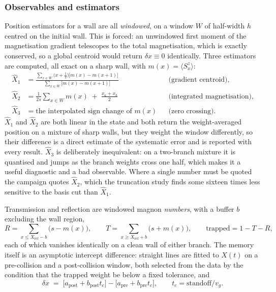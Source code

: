 \subsubsection{Observables and estimators}

Position estimators for a wall are all \emph{windowed}, on a window $W$ of
half-width $h$ centred on the initial wall. This is forced: an unwindowed
first moment of the magnetisation gradient telescopes to the total
magnetisation, which is exactly conserved, so a global centroid would return
$\delta x \equiv 0$ identically. Three estimators are computed, all exact on a
sharp wall, with $m(x) = \langle S^z_x\rangle$:
\begin{align}
  \hat X_1 &= \frac{\sum_{x\in W}\bigl(x+\tfrac12\bigr)\bigl[m(x)-m(x+1)\bigr]}
                   {\sum_{x\in W}\bigl[m(x)-m(x+1)\bigr]}
             && \text{(gradient centroid),}\label{eq:num-X1}\\
  \hat X_2 &= \frac{1}{2s}\sum_{x\in W} m(x) \;+\; \frac{x_a+x_b}{2}
             && \text{(integrated magnetisation),}\label{eq:num-X2}\\
  \hat X_3 &= \text{the interpolated sign change of } m(x)
             && \text{(zero crossing).}\label{eq:num-X3}
\end{align}
$\hat X_1$ and $\hat X_2$ are both linear in the state and both return the
weight-averaged position on a mixture of sharp walls, but they weight the
window differently, so their difference is a direct estimate of the systematic
error and is reported with every result. $\hat X_3$ is deliberately
inequivalent: on a two-branch mixture it is quantised and jumps as the branch
weights cross one half, which makes it a useful diagnostic and a bad
observable. Where a single number must be quoted the campaign quotes
$\hat X_2$, which the truncation study finds some sixteen times less sensitive
to the basis cut than $\hat X_1$.

Transmission and reflection are windowed magnon \emph{numbers}, with a buffer
$b$ excluding the wall region,
\begin{equation}
  R = \sum_{x \leq X_{\mathrm{ref}}-b}\bigl(s - m(x)\bigr), \qquad
  T = \sum_{x \geq X_{\mathrm{ref}}+b}\bigl(s + m(x)\bigr), \qquad
  \text{trapped} = 1 - T - R,
  \label{eq:num-TR}
\end{equation}
each of which vanishes identically on a clean wall of either branch. The
memory itself is an asymptotic intercept difference: straight lines are fitted
to $X(t)$ on a pre-collision and a post-collision window, both selected from
the data by the condition that the trapped weight be below a fixed tolerance,
and
\begin{equation}
  \delta x \;=\; \bigl[a_{\text{post}} + b_{\text{post}}t_c\bigr]
              - \bigl[a_{\text{pre}} + b_{\text{pre}}t_c\bigr],
  \qquad t_c = \text{standoff}/v_g .
  \label{eq:num-dx}
\end{equation}

